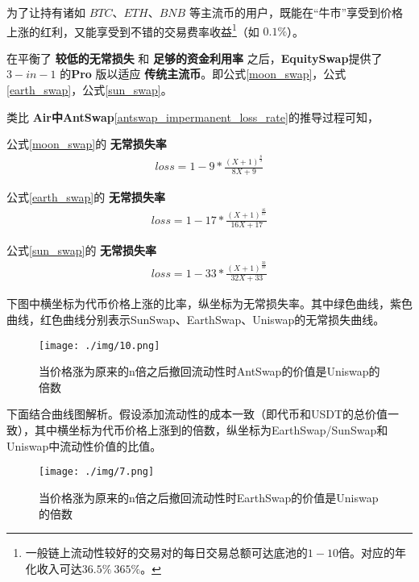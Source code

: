 \documentclass{article}
\begin{document}
为了让持有诸如 $BTC$、$ETH$、$BNB$ 等主流币的用户，既能在“牛市”享受到价格上涨的红利，又能享受到不错的交易费率收益\footnote{一般链上流动性较好的交易对的每日交易总额可达底池的$1-10$倍。对应的年化收入可达$36.5\% ~ 365\%$。}（如 $0.1\%$）。

在平衡了 \textbf{较低的无常损失} 和 \textbf{足够的资金利用率} 之后，\textbf{EquitySwap}提供了$3-in-1$ 的\textbf{Pro} 版以适应 \textbf{传统主流币}。即公式\ref{moon_swap}，公式\ref{earth_swap}，公式\ref{sun_swap}。

类比 \textbf{Air中AntSwap}\ref{antswap_impermanent_loss_rate}的推导过程可知，

公式\ref{moon_swap}的 \textbf{无常损失率}
\begin{equation}
\begin{split}
loss = 1 - 9 * \frac{(X + 1)^\frac{8}{9}}{8X + 9}
\end{split}
\end{equation}

公式\ref{earth_swap}的 \textbf{无常损失率}
\begin{equation}
\begin{split}
loss = 1 - 17 * \frac{(X + 1)^\frac{16}{17}}{16X + 17}
\end{split}
\end{equation}

公式\ref{sun_swap}的 \textbf{无常损失率}
\begin{equation}
\begin{split}
loss = 1 - 33 * \frac{(X + 1)^\frac{32}{33}}{32X + 33}
\end{split}
\end{equation}

下图中横坐标为代币价格上涨的比率，纵坐标为无常损失率。其中绿色曲线，紫色曲线，红色曲线分别表示SunSwap、EarthSwap、Uniswap的无常损失曲线。

\begin{figure}[H]
\centering
\texttt{[image: ./img/10.png]}
\caption{\label{fig}当价格涨为原来的n倍之后撤回流动性时AntSwap的价值是Uniswap的倍数}
\end{figure}

下面结合曲线图解析。假设添加流动性的成本一致（即代币和USDT的总价值一致），其中横坐标为代币价格上涨到的倍数，纵坐标为EarthSwap/SunSwap和Uniswap中流动性价值的比值。

\begin{figure}[H]
\centering
\texttt{[image: ./img/7.png]}
\caption{\label{fig}当价格涨为原来的n倍之后撤回流动性时EarthSwap的价值是Uniswap的倍数}
\end{figure}
\end{document}
